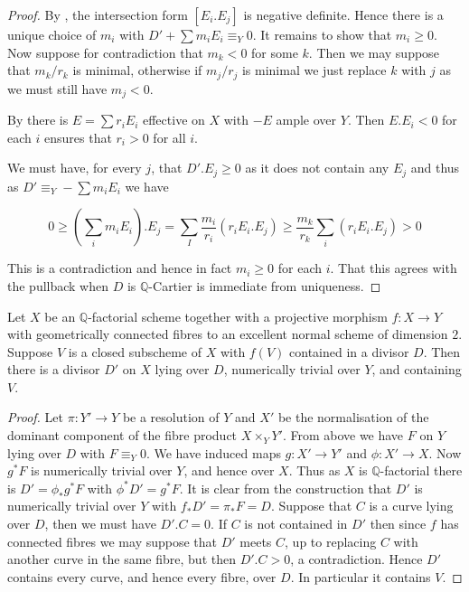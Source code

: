 \documentclass[a4paper,12pt]{amsart}
\begin{document}
	\begin{proof}
		
		By \cite[Theorem 10.1]{kk-singbook}, the intersection form $[E_{i}.E_{j}]$ is negative definite. Hence there is a unique choice of $m_{i}$ with $D'+\sum m_{i}E_{i} \equiv_{Y} 0$. It remains to show that $m_{i} \geq 0$. Now suppose for contradiction that $m_{k} < 0$ for some $k$. Then we may suppose that $m_{k}/r_{k}$ is minimal, otherwise if $m_{j}/r_{j}$ is minimal we just replace $k$ with $j$ as we must still have $m_{j} < 0$.
		
		By \cite[Lemma 10.2]{kk-singbook} there is $E= \sum r_{i}E_{i}$ effective on $X$ with $-E$ ample over $Y$. Then $E.E_{i} < 0$ for each $i$ ensures that $r_{i} > 0$ for all $i$.
				
		We must have, for every $j$, that $D'.E_{j}\geq 0 $ as it does not contain any $E_{j}$ and thus as $D' \equiv_{Y} - \sum m_{i}E_{i}$ we have
		
		\[0\geq (\sum_{i} m_{i} E_{i}).E_{j} = \sum_{I} \frac{m_{i}}{r_{i}}(r_{i}E_{i}.E_{j}) \geq \frac{m_{k}}{r_{k}} \sum_{i} (r_{i}E_{i}.E_{j}) > 0\]
		
		This is a contradiction and hence in fact $m_{i} \geq 0$ for each $i$. That this agrees with the pullback when $D$ is $\mathbb{Q}$-Cartier is immediate from uniqueness.
		
	\end{proof}
	
	\begin{lemma}\label{num-pull}
		
		Let $X$ be an $\mathbb{Q}$-factorial scheme together with a projective morphism $f:X \to Y$  with geometrically connected fibres to an excellent normal scheme of dimension $2$. Suppose $V$ is a closed subscheme of $X$ with $f(V)$ contained in a divisor $D$. Then there is a divisor $D'$ on $X$ lying over $D$, numerically trivial over $Y$, and containing $V$.
		
		\end{lemma}
	
	\begin{proof}
		
		Let $\pi \colon Y' \to Y$ be a resolution of $Y$ and $X'$ be the normalisation of the dominant component of the fibre product $X\times_{Y} Y'$. From above we have $F$ on $Y$ lying over $D$ with $F \equiv_{Y} 0$. We have induced maps $g\colon X' \to Y'$ and $\phi\colon  X' \to X$. Now $g^{*}F$ is numerically trivial over $Y$, and hence over $X$. Thus as $X$ is $\mathbb{Q}$-factorial there is $D'=\phi_{*}g^{*}F$ with $\phi^{*}D'=g^{*}F$. It is clear from the construction that $D'$ is numerically trivial over $Y$ with $f_{*}D'=\pi_{*}F=D$. Suppose that $C$ is a curve lying over $D$, then we must have $D'.C =0$. If $C$ is not contained in $D'$ then since $f$ has connected fibres we may suppose that $D'$ meets $C$, up to replacing $C$ with another curve in the same fibre, but then $D'.C > 0$, a contradiction. Hence $D'$ contains every curve, and hence every fibre, over $D$. In particular it contains $V$.		
	\end{proof}
	
\end{document}

